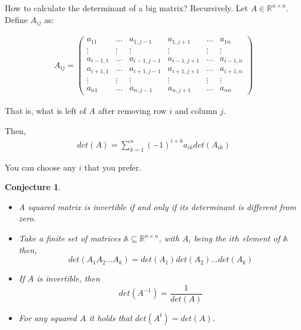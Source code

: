 \documentclass[aspectratio=169]{beamer}
\newtheorem{proposition}{Conjecture}[section]
\begin{document}
\begin{frame}
    How to calculate the determinant of a big matrix? Recursively. Let $A\in\mathbb{R}^{n\times n}$.
    Define $A_{ij}$ as:
    
    \begin{align*}
        A_{ij}=\left(
        \begin{array}{cccccc}
             a_{11} & \ldots & a_{1,j-1} & a_{1,j+1} & \ldots & a_{1n}  \\
             \vdots& \vdots & \vdots & \vdots & \vdots  & \vdots \\
             a_{i-1,1} & \ldots & a_{i-1,j-1} & a_{i-1,j+1} & \ldots & a_{i-1,n}\\
             a_{i+1,1} & \ldots & a_{i+1,j-1} & a_{i+1,j+1} & \ldots & a_{i+1,n}\\
             \vdots& \vdots & \vdots & \vdots & \vdots  & \vdots \\
             a_{n1} & \ldots & a_{n,j-1} & a_{n,j+1} & \ldots & a_{nn}  
        \end{array}
        \right)
    \end{align*}
    
    That is, what is left of $A$ after removing row $i$ and column $j$.
\end{frame}

\begin{frame}

    Then,
    \begin{align*}
        det(A)=\sum_{k=1}^n (-1)^{i+k} a_{ik} det(A_{ik})
    \end{align*}
    
    You can choose any $i$ that you prefer.
    
\end{frame}

\begin{frame}
    \begin{proposition}
    
    \begin{itemize}
        \item A squared matrix is invertible if and only if its determinant is different from zero.
        \item Take a finite set of matrices $\mathbb{A}\subseteq\mathbb{R}^{n\times n}$, with $A_i$ being the $ith$ element of $\mathbb{A}$ then, $$det(A_1A_2\ldots A_k)=det(A_1)det(A_2)\ldots det(A_k)$$
        \item If $A$ is invertible, then $$det(A^{-1})=\frac{1}{det(A)}$$
        \item For any squared $A$ it holds that $det(A^t)=det(A)$.
    \end{itemize}
        
    \end{proposition}
    
    
    
\end{frame}
\end{document}
